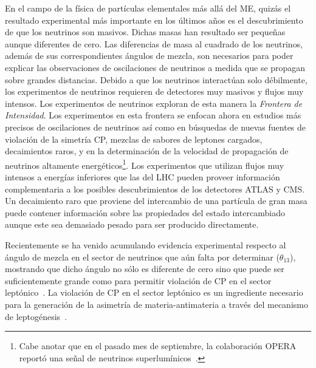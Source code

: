 En el campo de la física de partículas elementales más allá del
ME, quizás el resultado experimental más importante
en los últimos años es el descubrimiento de que los neutrinos
son masivos. Dichas masas han resultado ser pequeñas aunque diferentes de
cero. Las diferencias de masa al cuadrado de los neutrinos, además de sus
correspondientes ángulos de mezcla, son necesarios para poder explicar
las observaciones de oscilaciones de neutrinos a medida que se
propagan sobre grandes distancias. Debido a que los neutrinos
interactúan solo débilmente, los experimentos de neutrinos requieren
de detectores muy masivos y flujos muy
intensos. Los experimentos de neutrinos exploran de esta manera la
\emph{Frontera de Intensidad}. Los experimentos en esta frontera se
enfocan ahora en estudios más precisos de oscilaciones de neutrinos
así como en búsquedas de nuevas fuentes de violación de la simetría CP, mezclas de
sabores de leptones cargados, decaimientos raros, y en la
determinación de la velocidad de propagación de neutrinos altamente
energéticos\footnote{Cabe anotar que en el pasado mes de septiembre, 
la colaboración OPERA~\cite{opera} reportó una señal de neutrinos superlumínicos~\cite{:2011zb}.}.
Los experimentos que utilizan flujos muy intensos a energías
inferiores que las del LHC pueden proveer información complementaria a los
posibles descubrimientos de los detectores ATLAS y CMS. Un decaimiento
raro que proviene del intercambio de una partícula de gran masa puede
contener información sobre las propiedades del estado intercambiado
aunque este sea demasiado pesado para ser producido directamente.

Recientemente se ha venido acumulando evidencia experimental respecto
al ángulo de mezcla en el sector de neutrinos que aún falta por
determinar ($\theta_{13}$), mostrando que dicho ángulo no sólo es diferente de cero
sino que puede ser suficientemente grande como para permitir violación
de CP en el sector leptónico~\cite{Abe:2011sj,Schwetz:2011zk,doublechooz}. La violación de CP en el
sector leptónico es un ingrediente necesario para la generación de la asimetría
de materia-antimateria a través del mecanismo de
leptogénesis~\cite{Davidson:2008bu}.


